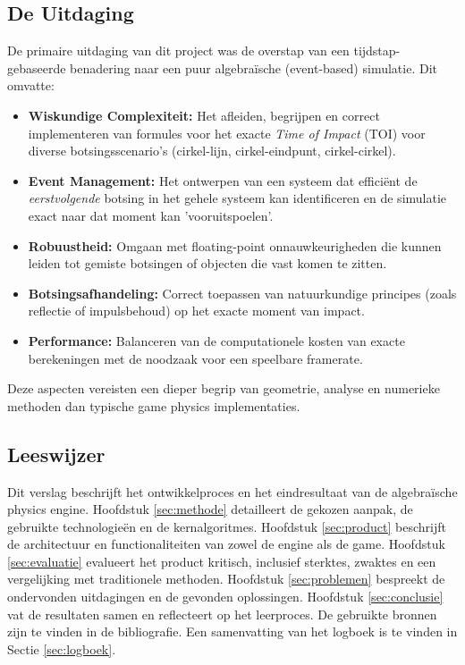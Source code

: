 \documentclass[11pt, a4paper]{article}
\begin{document}
\subsection{De Uitdaging}
De primaire uitdaging van dit project was de overstap van een tijdstap-gebaseerde benadering naar een puur algebraïsche (event-based) simulatie. Dit omvatte:
\begin{itemize}
    \item \textbf{Wiskundige Complexiteit:} Het afleiden, begrijpen en correct implementeren van formules voor het exacte \textit{Time of Impact} (TOI) voor diverse botsingsscenario's (cirkel-lijn, cirkel-eindpunt, cirkel-cirkel).
    \item \textbf{Event Management:} Het ontwerpen van een systeem dat efficiënt de \textit{eerstvolgende} botsing in het gehele systeem kan identificeren en de simulatie exact naar dat moment kan 'vooruitspoelen'.
    \item \textbf{Robuustheid:} Omgaan met floating-point onnauwkeurigheden die kunnen leiden tot gemiste botsingen of objecten die vast komen te zitten.
    \item \textbf{Botsingsafhandeling:} Correct toepassen van natuurkundige principes (zoals reflectie of impulsbehoud) op het exacte moment van impact.
    \item \textbf{Performance:} Balanceren van de computationele kosten van exacte berekeningen met de noodzaak voor een speelbare framerate.
\end{itemize}
Deze aspecten vereisten een dieper begrip van geometrie, analyse en numerieke methoden dan typische game physics implementaties.

\subsection{Leeswijzer}
Dit verslag beschrijft het ontwikkelproces en het eindresultaat van de algebraïsche physics engine. Hoofdstuk \ref{sec:methode} detailleert de gekozen aanpak, de gebruikte technologieën en de kernalgoritmes. Hoofdstuk \ref{sec:product} beschrijft de architectuur en functionaliteiten van zowel de engine als de game. Hoofdstuk \ref{sec:evaluatie} evalueert het product kritisch, inclusief sterktes, zwaktes en een vergelijking met traditionele methoden. Hoofdstuk \ref{sec:problemen} bespreekt de ondervonden uitdagingen en de gevonden oplossingen. Hoofdstuk \ref{sec:conclusie} vat de resultaten samen en reflecteert op het leerproces. De gebruikte bronnen zijn te vinden in de bibliografie. Een samenvatting van het logboek is te vinden in Sectie \ref{sec:logboek}. %
\newpage
\end{document}
